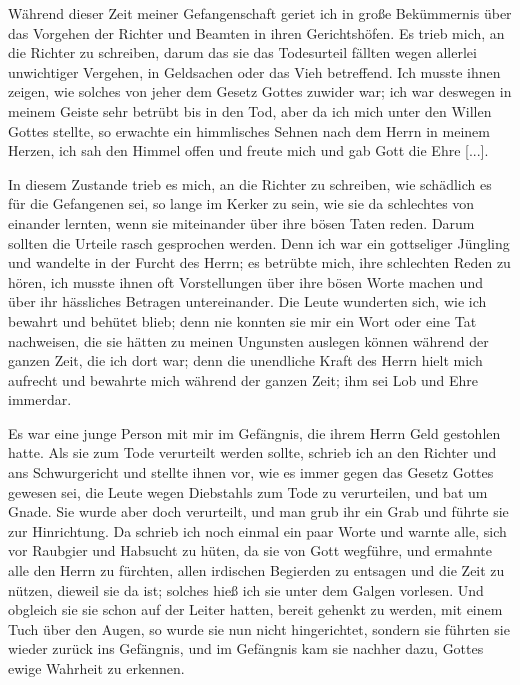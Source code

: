 Während dieser Zeit meiner Gefangenschaft geriet ich in
große Bekümmernis über das Vorgehen der Richter und Beamten
in ihren Gerichtshöfen. Es trieb mich, an die Richter zu schreiben,
darum das sie das Todesurteil fällten wegen allerlei unwichtiger
Vergehen, in Geldsachen oder das 
Vieh betreffend. Ich musste
ihnen zeigen, wie solches von jeher dem Gesetz Gottes zuwider
war; ich war deswegen in meinem Geiste sehr betrübt bis in den
Tod, aber da ich mich unter den Willen Gottes stellte, so 
erwachte ein himmlisches Sehnen nach dem Herrn in meinem Herzen,
ich sah den Himmel offen und freute mich und gab Gott die
Ehre [...].


In diesem Zustande trieb es mich, an die Richter zu schreiben,
wie schädlich es für die Gefangenen sei, so lange im Kerker zu
sein, wie sie da schlechtes von einander lernten, wenn sie 
miteinander über ihre bösen Taten reden. Darum sollten die Urteile
rasch gesprochen werden. Denn ich war ein gottseliger Jüngling
und wandelte in der Furcht des Herrn; es betrübte mich, ihre
schlechten Reden zu hören, ich musste ihnen oft Vorstellungen über
ihre bösen Worte machen und über ihr hässliches Betragen 
untereinander. Die Leute wunderten sich, wie ich bewahrt und behütet
blieb; denn nie konnten sie mir ein Wort oder eine Tat 
nachweisen, die sie hätten zu meinen Ungunsten auslegen können
während der ganzen Zeit, die ich dort war; denn die unendliche
Kraft des Herrn hielt mich aufrecht und bewahrte mich während
der ganzen Zeit; ihm sei Lob und Ehre immerdar.


Es war eine junge Person mit mir im Gefängnis, die ihrem
Herrn Geld gestohlen hatte. Als sie zum Tode verurteilt werden
sollte, schrieb ich an den Richter und ans Schwurgericht und
stellte ihnen vor, wie es immer gegen das Gesetz Gottes gewesen
sei, die Leute wegen Diebstahls zum Tode zu verurteilen, und
bat um Gnade. Sie wurde aber doch 
verurteilt, und man grub
ihr ein Grab und führte sie zur Hinrichtung. Da schrieb ich noch
einmal ein paar Worte und warnte alle, sich vor Raubgier und
Habsucht zu hüten, da sie von Gott wegführe, und ermahnte alle
den Herrn zu fürchten, allen irdischen Begierden zu entsagen und
die Zeit zu nützen, dieweil sie da ist; solches hieß ich sie unter
dem Galgen vorlesen. Und obgleich sie sie schon auf der Leiter
hatten, bereit gehenkt zu werden, mit einem Tuch über den Augen,
so wurde sie nun nicht hingerichtet, sondern sie führten sie wieder
zurück ins Gefängnis, und im Gefängnis kam sie nachher dazu,
Gottes ewige Wahrheit zu erkennen.



